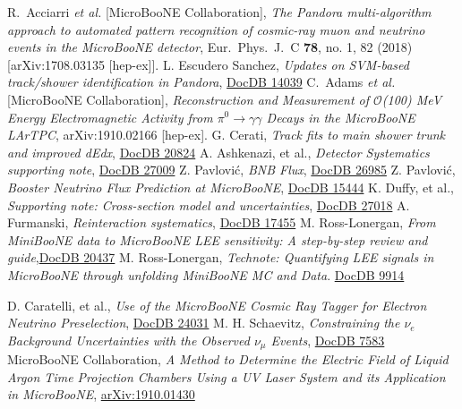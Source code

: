 \documentclass[a4paper]{article}
\begin{document}
\begin{thebibliography}{}
  R.~Acciarri {\it et al.} [MicroBooNE Collaboration],
  \emph{The Pandora multi-algorithm approach to automated pattern recognition of cosmic-ray muon and neutrino events in the MicroBooNE detector}, Eur.\ Phys.\ J.\ C {\bf 78}, no. 1, 82 (2018) [arXiv:1708.03135 [hep-ex]].
L. Escudero Sanchez, \emph{Updates on SVM-based track/shower identification in Pandora},
\href{https://microboone-docdb.fnal.gov/cgi-bin/private/ShowDocument?docid=14039}{DocDB 14039}
  C.~Adams {\it et al.} [MicroBooNE Collaboration],
  \emph{Reconstruction and Measurement of $\mathcal{O}$(100) MeV Energy Electromagnetic Activity from $\pi^0 \rightarrow \gamma\gamma$ Decays in the MicroBooNE LArTPC},  arXiv:1910.02166 [hep-ex].
G. Cerati, \emph{Track fits to main shower trunk and improved dEdx}, \href{https://microboone-docdb.fnal.gov/cgi-bin/private/ShowDocument?docid=20824}{DocDB 20824}
A. Ashkenazi, et al., \emph{Detector Systematics supporting note}, \href{https://microboone-docdb.fnal.gov/cgi-bin/private/ShowDocument?docid=27009}{DocDB 27009}
Z. Pavlović, \emph{BNB Flux}, \href{https://microboone-docdb.fnal.gov/cgi-bin/private/RetrieveFile?docid=26985}{DocDB 26985}
Z. Pavlović, \emph{Booster Neutrino Flux Prediction at MicroBooNE}, \href{https://microboone-docdb.fnal.gov/cgi-bin/private/RetrieveFile?docid=15444}{DocDB 15444}
K. Duffy, et al., \emph{Supporting note: Cross-section model and uncertainties}, \href{https://microboone-docdb.fnal.gov/cgi-bin/private/ShowDocument?docid=27018}{DocDB 27018}
A. Furmanski, \emph{Reinteraction systematics}, \href{https://microboone-docdb.fnal.gov/cgi-bin/private/ShowDocument?docid=17455}{DocDB 17455}
M. Ross-Lonergan, \emph{From MiniBooNE data to MicroBooNE LEE sensitivity: A step-by-step review and guide},\href{https://microboone-docdb.fnal.gov/cgi-bin/private/RetrieveFile?docid=20437}{DocDB 20437}
 M. Ross-Lonergan, \emph{Technote: Quantifying LEE signals in MicroBooNE through unfolding MiniBooNE MC and Data}. \href{https://microboone-docdb.fnal.gov/cgi-bin/private/ShowDocument?docid=9914}{DocDB 9914}


D. Caratelli, et al., \emph{Use of the MicroBooNE Cosmic Ray Tagger for Electron Neutrino Preselection}, \href{https://microboone-docdb.fnal.gov/cgi-bin/private/RetrieveFile?docid=24031&filename=CRTPACTechnote.pdf&version=1}{DocDB 24031}
M. H. Schaevitz, \emph{Constraining the $\nu_e$ Background Uncertainties with the Observed $\nu_\mu$ Events}, \href{https://microboone-docdb.fnal.gov/cgi-bin/private/RetrieveFile?docid=7583}{DocDB 7583}
MicroBooNE Collaboration, \emph{A Method to Determine the Electric Field of Liquid Argon Time Projection Chambers Using a UV Laser System and its Application in MicroBooNE}, \href{https://arxiv.org/abs/1910.01430}{arXiv:1910.01430}


\end{thebibliography}
\end{document}
